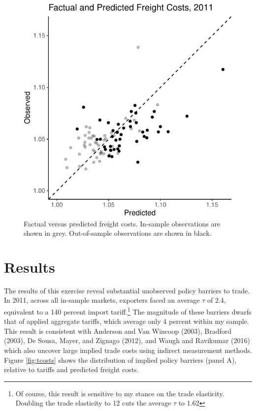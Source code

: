 \documentclass{puthesis}
\begin{document}
\begin{figure}
\centering
\includegraphics{figure/freight-1.pdf}
\caption{Factual versus predicted freight costs. In-sample observations
are shown in grey. Out-of-sample observations are shown in black.
\label{fig:freight}}
\end{figure}

\section{Results}

The results of this exercise reveal substantial unobserved policy
barriers to trade. In 2011, across all in-sample markets, exporters
faced an average \(\tau\) of 2.4, equivalent to a 140 percent import
tariff.\footnote{Of course, this result is sensitive to my stance on the
  trade elasticity. Doubling the trade elasticity to 12 cuts the average
  \(\tau\) to 1.62} The magnitude of these barriers dwarfs that of
applied aggregate tariffs, which average only 4 percent within my
sample. This result is consistent with Anderson and Van Wincoop (2003),
Bradford (2003), De Sousa, Mayer, and Zignago (2012), and Waugh and
Ravikumar (2016) which also uncover large implied trade costs using
indirect measurement methods. Figure \ref{fig:tcosts} shows the
distribution of implied policy barriers (panel A), relative to tariffs
and predicted freight costs.
\end{document}
